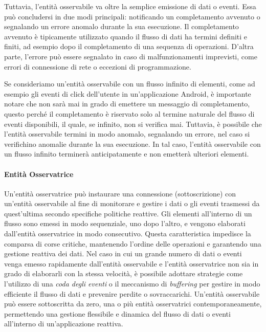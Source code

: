 \documentclass[12pt,a4paper,openright,twoside]{book}
\begin{document}
Tuttavia, l'entità osservabile va oltre la semplice emissione di dati o eventi. Essa può concludersi in due modi principali: notificando un completamento avvenuto o segnalando un errore anomalo durante la sua esecuzione. Il completamento avvenuto è tipicamente utilizzato quando il flusso di dati ha termini definiti e finiti, ad esempio dopo il completamento di una sequenza di operazioni. D'altra parte, l'errore può essere segnalato in caso di malfunzionamenti imprevisti, come errori di connessione di rete o eccezioni di programmazione.

Se consideriamo un'entità osservabile con un flusso infinito di elementi, come ad esempio gli eventi di click dell'utente in un'applicazione Android, è importante notare che non sarà mai in grado di emettere un messaggio di completamento, questo perché il completamento è riservato solo al termine naturale del flusso di eventi disponibili, il quale, se infinito, non si verifica mai. Tuttavia, è possibile che l'entità osservabile termini in modo anomalo, segnalando un errore, nel caso si verifichino anomalie durante la sua esecuzione. In tal caso, l'entità osservabile con un flusso infinito terminerà anticipatamente e non emetterà ulteriori elementi.

\paragraph{Entità Osservatrice}
Un'entità osservatrice può instaurare una connessione (sottoscrizione) con un'entità osservabile al fine di monitorare e gestire i dati o gli eventi trasmessi da quest'ultima secondo specifiche politiche reattive. 
Gli elementi all'interno di un flusso sono emessi in modo sequenziale, uno dopo l'altro, e vengono elaborati dall'entità osservatrice in modo consecutivo. Questa caratteristica impedisce la comparsa di corse critiche, mantenendo l'ordine delle operazioni e garantendo una gestione reattiva dei dati.
Nel caso in cui un grande numero di dati o eventi venga emesso rapidamente dall'entità osservabile e l'entità osservatrice non sia in grado di elaborarli con la stessa velocità, è possibile adottare strategie come l'utilizzo di una \textit{coda degli eventi} o il meccanismo di \textit{buffering} per gestire in modo efficiente il flusso di dati e prevenire perdite o sovraccarichi.
Un'entità osservabile può essere sottoscritta da zero, una o più entità osservatrici contemporaneamente, permettendo una gestione flessibile e dinamica del flusso di dati o eventi all'interno di un'applicazione reattiva. 
\end{document}
